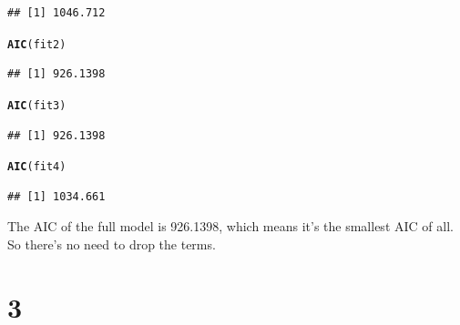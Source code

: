 \documentclass{article}\usepackage[]{graphicx}\usepackage[]{color}
\makeatletter
\newcommand{\hlstd}[1]{\textcolor[rgb]{0.345,0.345,0.345}{#1}}%
\newcommand{\hlkwd}[1]{\textcolor[rgb]{0.737,0.353,0.396}{\textbf{#1}}}%
\newenvironment{kframe}{%
 \def\at@end@of@kframe{}%
 \ifinner\ifhmode%
  \def\at@end@of@kframe{\end{minipage}}%
  \begin{minipage}{\columnwidth}%
 \fi\fi%
 \def\FrameCommand##1{\hskip\@totalleftmargin \hskip-\fboxsep
 \colorbox{shadecolor}{##1}\hskip-\fboxsep
     \hskip-\linewidth \hskip-\@totalleftmargin \hskip\columnwidth}%
 \MakeFramed {\advance\hsize-\width
   \@totalleftmargin\z@ \linewidth\hsize
   \@setminipage}}%
 {\par\unskip\endMakeFramed%
 \at@end@of@kframe}
\newenvironment{knitrout}{}{} %
\makeatother
\begin{document}
\begin{enumerate}[(a)]
\begin{knitrout}
\begin{kframe}
\begin{alltt}
\end{alltt}
\begin{verbatim}
## [1] 1046.712
\end{verbatim}
\begin{alltt}
  \hlkwd{AIC}\hlstd{(fit2)}
\end{alltt}
\begin{verbatim}
## [1] 926.1398
\end{verbatim}
\begin{alltt}
  \hlkwd{AIC}\hlstd{(fit3)}
\end{alltt}
\begin{verbatim}
## [1] 926.1398
\end{verbatim}
\begin{alltt}
  \hlkwd{AIC}\hlstd{(fit4)}
\end{alltt}
\begin{verbatim}
## [1] 1034.661
\end{verbatim}
\end{kframe}
\end{knitrout}

\qquad The AIC of the full model is 926.1398, which means it's the smallest AIC of all. So there's no need to drop the terms.

\end{enumerate}

\section{3}
\end{document}
